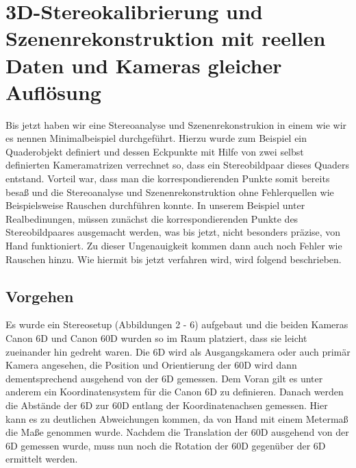 \chapter{3D-Stereokalibrierung und Szenenrekonstruktion mit reellen Daten und Kameras gleicher Auflösung}

	Bis jetzt haben wir eine Stereoanalyse und Szenenrekonstrukion in einem wie wir es nennen Minimalbeispiel durchgeführt. Hierzu wurde zum Beispiel ein Quaderobjekt definiert und dessen Eckpunkte mit Hilfe von zwei selbst definierten Kameramatrizen verrechnet so, dass ein Stereobildpaar dieses Quaders entstand. Vorteil war, dass man die korrespondierenden Punkte somit bereits besaß und die Stereoanalyse und Szenenrekonstruktion ohne Fehlerquellen wie Beispielsweise Rauschen durchführen konnte. In unserem Beispiel unter Realbedinungen, müssen zunächst die korrespondierenden Punkte des Stereobildpaares ausgemacht werden, was bis jetzt, nicht besonders präzise, von Hand funktioniert. Zu dieser Ungenauigkeit kommen dann auch noch Fehler wie Rauschen hinzu. Wie hiermit bis jetzt verfahren wird, wird folgend beschrieben.  


\section{Vorgehen}
	
Es wurde ein Stereosetup (Abbildungen 2 - 6) aufgebaut und die beiden Kameras Canon 6D und Canon 60D wurden so im Raum platziert, dass sie leicht zueinander hin gedreht waren. Die 6D wird als Ausgangskamera oder auch primär Kamera angesehen, die Position und Orientierung der 60D wird dann dementsprechend ausgehend von der 6D gemessen. Dem Voran gilt es unter anderem ein Koordinatensystem für die Canon 6D zu definieren. Danach werden die Abstände der 6D zur 60D entlang der Koordinatenachsen gemessen. Hier kann es zu deutlichen Abweichungen kommen, da von Hand mit einem Metermaß die Maße genommen wurde. Nachdem die Translation der 60D ausgehend von der 6D gemessen wurde, muss nun noch die Rotation der 60D gegenüber der 6D ermittelt werden.	

